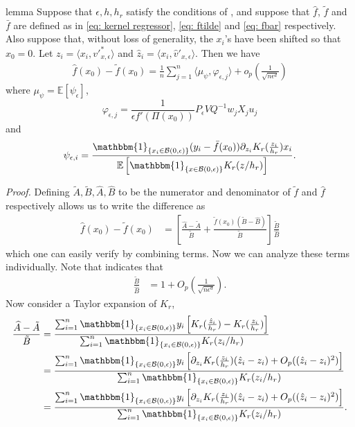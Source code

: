 \documentclass[11pt]{article}
\begin{document}
\begin{restatable}{lemma}{}\label{lemma: fhat minus ftilde}
    Suppose that $\epsilon, h, h_r$ satisfy the conditions of , and suppose that $\hat{f}$, $\tilde{f}$ and $\bar{f}$ are defined as in \cref{eq: kernel regressor}, \cref{eq: ftilde} and \cref{eq: fbar} respectively. Also suppose that, without loss of generality, the $x_i$'s have been shifted so that $x_0 = 0$. Let $z_i = \langle x_i, v'^*_{x, \epsilon}\rangle$ and $\hat{z}_i = \langle x_i, \hat{v}'_{x, \epsilon}\rangle$. Then we have
    \begin{align}
        \hat{f}(x_0) - \tilde{f}(x_0) = \frac{1}{n}\sum_{j = 1}^n\langle\mu_{\psi}, \varphi_{\epsilon, j}\rangle + o_p\left(\frac{1}{\sqrt{n\epsilon^d}}\right)
    \end{align}
    where $\mu_{\psi} = \mathbb{E}[\psi_{\epsilon}]$,  
    \[\varphi_{\epsilon, j} = \frac{1}{\epsilon f'(\Pi(x_0))}P_{\epsilon}VQ^{-1}w_jX_ju_j\]
    and
    \[\psi_{\epsilon, i} = \frac{\mathbbm{1}_{\{x_i \in \mathcal{B}(0, \epsilon)\}}(y_i - \bar{f}(x_0))\partial_{z_i}K_r(\frac{z_i}{h_r})x_i}{\mathbb{E}\left[\mathbbm{1}_{\{x \in \mathcal{B}(0, \epsilon)\}}K_r(z/h_r)\right]}.\]
\end{restatable}
\noindent \textit{Proof.} 
Defining $\tilde{A}, \tilde{B}, \widehat{A}, \widehat{B}$ to be the numerator and denominator of $\tilde{f}$ and $\hat{f}$ respectively allows us to write the difference as
\begin{align}
    \hat{f}(x_0) - \tilde{f}(x_0)  &= \left[\frac{\widehat{A}-\tilde{A}}{\tilde{B}} + \frac{\tilde f(x_0)\left(\tilde{B} - \widehat{B}\right)}{\tilde{B}}\right]\frac{\tilde{B}}{\widehat{B}} \label{eq: kdr estimator decomp}
\end{align}
which one can easily verify by combining terms. Now we can analyze these terms individually. Note that  indicates that
\begin{align*}
    \frac{\tilde{B}}{\widehat{B}} &= 1  + O_p\left(\frac{1}{\sqrt{n\epsilon^d}}\right).
\end{align*}
Now consider a Taylor expansion of $K_r$,
\begin{align*}
    \frac{\widehat{A} - \tilde{A}}{\tilde{B}} &= \frac{\sum_{i=1}^n\mathbbm{1}_{\{x_i \in \mathcal{B}(0, \epsilon)\}}y_i\left[K_r(\frac{\hat{z}_i}{h_r}) - K_r(\frac{z_i}{h_r})\right]}{\sum_{i = 1}^n\mathbbm{1}_{\{x_i \in \mathcal{B}(0, \epsilon)\}}K_r(z_i/h_r)} \\
    &= \frac{\sum_{i=1}^n\mathbbm{1}_{\{x_i \in \mathcal{B}(0, \epsilon)\}}y_i\left[\partial_{z_i}K_r(\frac{z_i}{h_r})(\hat{z}_i - z_i) + O_p((\hat{z}_i - z_i)^2)\right]}{\sum_{i = 1}^n\mathbbm{1}_{\{x_i \in \mathcal{B}(0, \epsilon)\}}K_r(z_i/h_r)} \\
    &= \frac{\sum_{i=1}^n\mathbbm{1}_{\{x_i \in \mathcal{B}(0, \epsilon)\}}y_i\left[\partial_{z_i}K_r(\frac{z_i}{h_r})(\hat{z}_i - z_i) + O_p((\hat{z}_i - z_i)^2)\right]}{\sum_{i = 1}^n\mathbbm{1}_{\{x_i \in \mathcal{B}(0, \epsilon)\}}K_r(z_i/h_r)}.
\end{align*}
\end{document}
